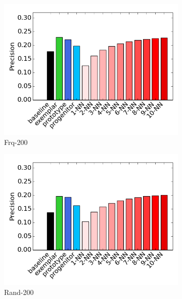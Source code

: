 \documentclass[output=paper]{langsci/langscibook}
\begin{document}
\begin{figure}
\begin{subfigure}{.32\textwidth}
  \centering
  \includegraphics[width=.96\linewidth]{figures/GREWAL_aggregate_precision_frq200.png}
  \caption{\sc Frq-200}
\end{subfigure}\begin{subfigure}{.32\textwidth}
  \centering
  \includegraphics[width=.96\linewidth]{figures/GREWAL_aggregate_precision_rand200.png}
  \caption{\sc Rand-200}
\end{subfigure}\begin{subfigure}{.32\textwidth}
  \centering

\end{subfigure}
\end{figure}
\end{document}
